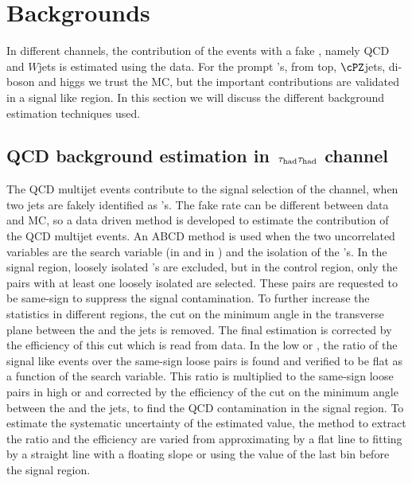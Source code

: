 \section{Backgrounds}
\label{sect:bkgLepTau}
In different channels, the contribution of the events with a fake \Tau, namely QCD and $W$jets is estimated using the data. 
For the prompt \Tau's, from top, $\cPZ$jets, di-boson and higgs we trust 
the MC, but the important contributions are validated in a signal like region. 
In this section we will discuss the different background estimation techniques used.

\subsection{\texorpdfstring{QCD background estimation in $\,\tau_{\rm had}\tau_{\rm had}$ channel}{QCD background estimation in tau-tau channel}}
The QCD multijet events contribute to the signal selection of the \tauTau channel, when two jets are 
fakely identified as \Tau's. The fake rate can be different between data and MC, so a data driven method is developed to estimate the 
contribution of the QCD multijet events. 
An ABCD method is used when the two uncorrelated variables are the search variable (\mttwo in \binone and \SumMT in \bintwo) and the 
isolation of the \Tau's. In the signal region, loosely isolated  \Tau's 
are excluded, but in the control region, only the pairs with at least one loosely isolated \Tau are selected. 
These pairs are requested to be same-sign to suppress the signal contamination. To further increase the statistics 
in different regions, the cut on the minimum angle in the transverse plane between the \MET and the jets is removed. The final estimation
is corrected by the efficiency of this cut which is read from data. 
In the low \mttwo or \SumMT, the ratio of the signal like events over the same-sign loose pairs 
is found and verified to be flat as a function of the search variable. 
This ratio is multiplied to the same-sign loose pairs in high \mttwo or \SumMT and corrected by the efficiency of the 
cut on the minimum angle between the \MET and the jets, to find the QCD contamination in the signal region. 
To estimate the systematic uncertainty of the estimated value, the method to extract the
ratio and the efficiency are varied from approximating by a flat line to fitting by a straight line with a floating slope 
or using the value of the  last bin before the signal region. 



